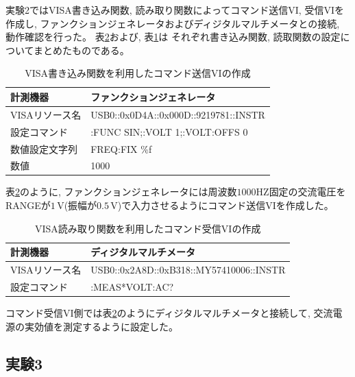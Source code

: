実験2ではVISA書き込み関数, 読み取り関数によってコマンド送信VI, 受信VIを作成し, 
ファンクションジェネレータおよびディジタルマルチメータとの接続, 動作確認を行った。
表\ref{tab:autosettting_r}および, 表\ref{tab:autosettting_w}は
それぞれ書き込み関数, 読取関数の設定についてまとめたものである。
\begin{table}[htbp]
	\centering
	\caption{VISA書き込み関数を利用したコマンド送信VIの作成}
	\label{tab:autosettting_w}
	\small
	\begin{tabular}{l|l}
		\hline\hline
		計測機器&ファンクションジェネレータ\\ \hline
		VISAリソース名&USB0::0x0D4A::0x000D::9219781::INSTR\\ \hline
		設定コマンド&:FUNC SIN;:VOLT 1;:VOLT:OFFS 0\\ \hline
		数値設定文字列&FREQ:FIX \%f \\ \hline
		数値&1000 \\
		\hline
	\end{tabular}
\end{table}
表\ref{tab:autosettting_r}のように, ファンクションジェネレータには周波数$1000\mathrm{HZ}$固定の交流電圧を
RANGEが$1 \, \mathrm{V}$(振幅が$0.5 \, \mathrm{V}$)で入力させるようにコマンド送信VIを作成した。

\begin{table}[htbp]
	\centering
	\caption{VISA読み取り関数を利用したコマンド受信VIの作成}
	\label{tab:autosettting_r}
	\small
	\begin{tabular}{l|l}
		\hline\hline
		計測機器&ディジタルマルチメータ\\ \hline
		VISAリソース名&USB0::0x2A8D::0xB318::MY57410006::INSTR\\ \hline
		設定コマンド&:MEAS*VOLT:AC? \\\hline
	\end{tabular}
\end{table}
コマンド受信VI側では表\ref{tab:autosettting_r}のようにディジタルマルチメータと接続して,
交流電源の実効値を測定するように設定した。

\subsection{実験3}